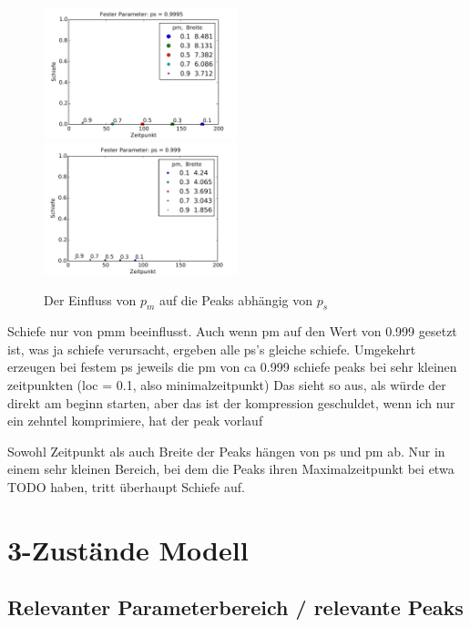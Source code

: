 \begin{figure}[h]
\includegraphics[width=0.5\textwidth]{bilder/pm/pmfest_ps09995}
\includegraphics[width=0.5\textwidth]{bilder/pm/pmfest_ps0999}

\caption{Der Einfluss von $p_{m}$ auf die Peaks abhängig von $p_{s}$}
\label{einfluss_pm_1}
\end{figure}


Schiefe nur von pmm beeinflusst. Auch wenn pm auf den Wert von 0.999 gesetzt ist, was ja schiefe verursacht, ergeben alle ps's gleiche schiefe. Umgekehrt erzeugen bei festem ps jeweils die pm von ca 0.999 schiefe peaks bei sehr kleinen zeitpunkten (loc = 0.1, also minimalzeitpunkt) Das sieht so aus, als würde der direkt am beginn starten, aber das ist der kompression geschuldet, wenn ich nur ein zehntel komprimiere, hat der peak vorlauf

Sowohl Zeitpunkt als auch Breite der Peaks hängen von ps und pm ab.
Nur in einem sehr kleinen Bereich, bei dem die Peaks ihren Maximalzeitpunkt bei etwa TODO haben, tritt überhaupt Schiefe auf. 






\section{3-Zustände Modell}


\subsection{Relevanter Parameterbereich / relevante Peaks}

